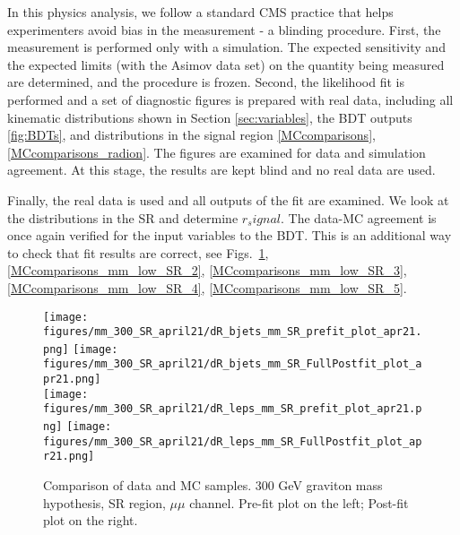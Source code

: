 In this physics analysis, we follow a standard CMS practice that helps experimenters avoid bias in the measurement - a blinding procedure. First, the measurement is performed only with a simulation. The expected sensitivity and the expected limits (with the Asimov data set) on the quantity being measured are determined, and the procedure is frozen. Second, the likelihood fit is performed and a set of diagnostic figures is prepared with real data, including all kinematic distributions shown in Section \ref{sec:variables}, the BDT outputs \ref{fig:BDTs}, and \mTHH distributions in the signal region \ref{MCcomparisons}, \ref{MCcomparisons_radion}. The figures are examined for data and simulation agreement.  At this stage, the results are kept blind and no real data are used. 

Finally, the real data is used and all outputs of the fit are examined. We look at the distributions in the SR and determine $r_signal$. The data-MC agreement is once again verified for the input variables to the BDT. This is an additional way to check that fit results are correct, see Figs.~\ref{MCcomparisons_mm_low_SR_1}, \ref{MCcomparisons_mm_low_SR_2}, \ref{MCcomparisons_mm_low_SR_3}, \ref{MCcomparisons_mm_low_SR_4}, \ref{MCcomparisons_mm_low_SR_5}. 


\begin{figure}[H]
\begin{center}
\texttt{[image: figures/mm\_300\_SR\_april21/dR\_bjets\_mm\_SR\_prefit\_plot\_apr21.png]}
\texttt{[image: figures/mm\_300\_SR\_april21/dR\_bjets\_mm\_SR\_FullPostfit\_plot\_apr21.png]}\\
\texttt{[image: figures/mm\_300\_SR\_april21/dR\_leps\_mm\_SR\_prefit\_plot\_apr21.png]}
\texttt{[image: figures/mm\_300\_SR\_april21/dR\_leps\_mm\_SR\_FullPostfit\_plot\_apr21.png]}\\
\caption[Data-MC comparison in the SR.]{Comparison of data and MC samples. 300 GeV graviton mass hypothesis, SR region, $\mu\mu$ channel. Pre-fit plot on the left; Post-fit plot on the right.}
\label{MCcomparisons_mm_low_SR_1}
\end{center}
\end{figure}

